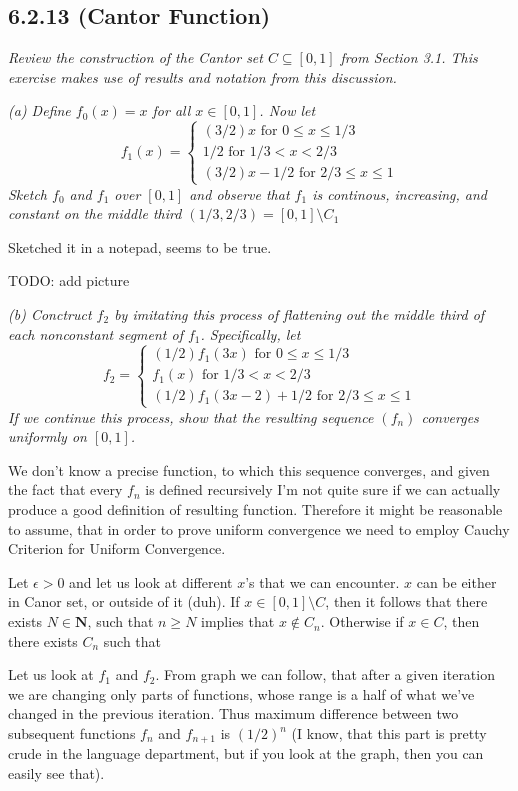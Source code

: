 \documentclass[11pt,oneside,titlepage]{book}
\begin{document}
\subsection*{6.2.13 (Cantor Function)}
\textit{Review the construction of the Cantor set $C \subseteq [0, 1]$ from
  Section 3.1. This exercise makes use of results and notation from this
  discussion.}

\textit{(a) Define $f_0(x) = x$ for all $x \in [0, 1]$. Now let }
$$f_1(x) =
\begin{cases}
  (3/2)x \text{ for } 0 \leq x \leq 1/3 \\
  1/2 \text{ for } 1/3 < x < 2/3 \\
  (3/2)x - 1/2 \text{ for } 2/3 \leq x \leq 1
\end{cases}
$$
\textit{Sketch $f_0$ and $f_1$ over $[0, 1]$ and observe that $f_1$ is
  continous, increasing, and constant on the middle third
  $(1/3, 2/3) = [0, 1] \setminus C_1$}

Sketched it in a notepad, seems to be true.

TODO: add picture

\textit{(b) Conctruct $f_2$ by imitating this process of flattening out the
  middle third of each nonconstant segment of $f_1$. Specifically, let }
$$f_2 =
\begin{cases}
  (1/2)f_1(3x) \text{ for } 0 \leq x \leq 1/3 \\
  f_1(x) \text{ for } 1/3 < x < 2/3 \\
  (1/2)f_1(3x - 2) + 1/2 \text{ for } 2/3 \leq x \leq 1
\end{cases}
$$
\textit{If we continue this process, show that the resulting sequence $(f_n)$
converges uniformly on $[0, 1]$.}

We don't know a precise function, to which this sequence converges, and
given the fact that every $f_n$ is defined recursively I'm not quite sure if we
can actually produce a good definition of resulting function. Therefore
it might be reasonable to assume, that in order to prove uniform
convergence we need to employ Cauchy Criterion for Uniform Convergence.

Let $\epsilon > 0$ and let us look at different $x$'s that we can encounter.
$x$ can be either in Canor set, or outside of it (duh). If
$x \in [0, 1] \setminus C$, then it follows that there exists
$N \in \textbf{N}$, such that $n \geq N$ implies that $x \notin C_n$.
Otherwise if $x \in C$, then there exists $C_n$ such that 

Let us look at $f_1$ and $f_2$. From graph we can follow, that after a given
iteration we are changing only parts of functions, whose range is a half
of what we've changed in the previous iteration. Thus
maximum difference between two subsequent functions $f_n$ and $f_{n + 1}$
is $(1/2)^{n}$ (I know, that this part is pretty crude in the language
department, but if you look
at the graph, then you can easily see that).
\end{document}
